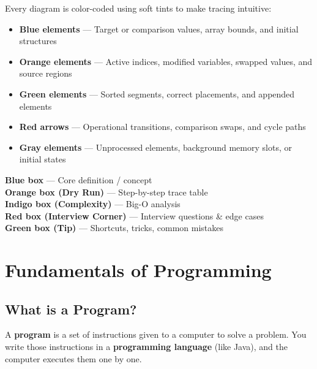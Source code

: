 \documentclass[12pt,a4paper,oneside]{book}
\begin{document}
\begin{tipbox}
Every diagram is color-coded using soft tints to make tracing intuitive:
\begin{itemize}
  \item \textbf{Blue elements} --- Target or comparison values, array bounds, and initial structures
  \item \textbf{Orange elements} --- Active indices, modified variables, swapped values, and source regions
  \item \textbf{Green elements} --- Sorted segments, correct placements, and appended elements
  \item \textbf{Red arrows} --- Operational transitions, comparison swaps, and cycle paths
  \item \textbf{Gray elements} --- Unprocessed elements, background memory slots, or initial states
\end{itemize}
\end{tipbox}

\begin{warningbox}
\textbf{Blue box} --- Core definition / concept\\
\textbf{Orange box (Dry Run)} --- Step-by-step trace table\\
\textbf{Indigo box (Complexity)} --- Big-O analysis\\
\textbf{Red box (Interview Corner)} --- Interview questions \& edge cases\\
\textbf{Green box (Tip)} --- Shortcuts, tricks, common mistakes
\end{warningbox}

\mainmatter

\chapter{Fundamentals of Programming}

\section{What is a Program?}

A \textbf{program} is a set of instructions given to a computer to solve a problem. You write those instructions in a \textbf{programming language} (like Java), and the computer executes them one by one.
\end{document}
